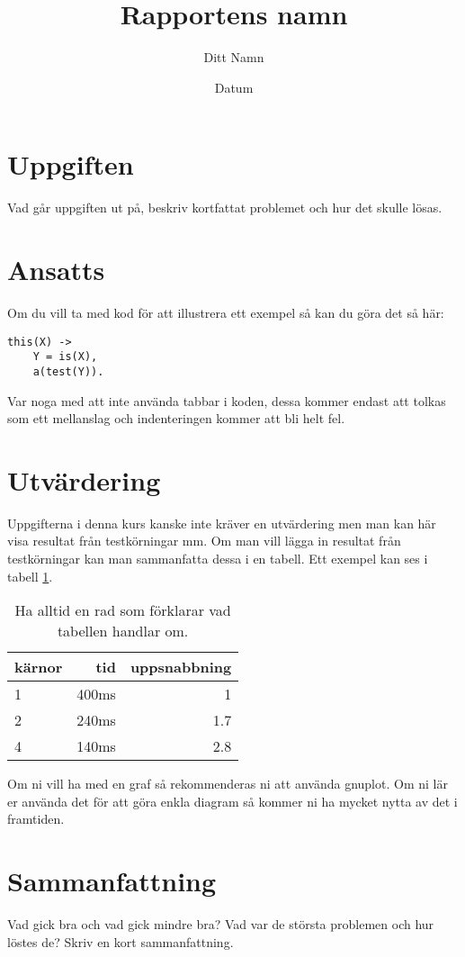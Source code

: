 \documentclass[a4paper, 11pt]{article}
\title{Rapportens namn}
\author{Ditt Namn}
\date{Datum}
\begin{document}
\maketitle 

\section{Uppgiften}

Vad går uppgiften ut på, beskriv kortfattat problemet och hur det skulle lösas.

\section{Ansatts}

Om du vill ta med kod för att illustrera ett exempel så kan du göra det så här:

\begin{verbatim}
this(X) ->
    Y = is(X),
    a(test(Y)).
\end{verbatim}

Var noga med att inte använda tabbar i koden, dessa kommer endast att
tolkas som ett mellanslag och indenteringen kommer att bli helt fel. 

\section{Utvärdering}

Uppgifterna i denna kurs kanske inte kräver en utvärdering men man kan
här visa resultat från testkörningar mm. Om man vill lägga in resultat
från testkörningar kan man sammanfatta dessa i en tabell. Ett exempel
kan ses i tabell \ref{tab:results}. 


\begin{table}
\centering
\begin{tabular}{|l|r|r|}  
\hline
kärnor & tid & uppsnabbning\\
\hline
1 & 400ms & 1\\
\hline
2 & 240ms & 1.7\\
\hline
4 & 140ms & 2.8\\
\hline
\end{tabular}
\caption{Ha alltid en rad som förklarar vad tabellen handlar om.}
\label{tab:results}
\end{table}

Om ni vill ha med en graf så rekommenderas ni att använda gnuplot. Om
ni lär er använda det för att göra enkla diagram så kommer ni ha
mycket nytta av det i framtiden.


\section{Sammanfattning}

Vad gick bra och vad gick mindre bra? Vad var de största problemen och
hur löstes de? Skriv en kort sammanfattning.
\end{document}

